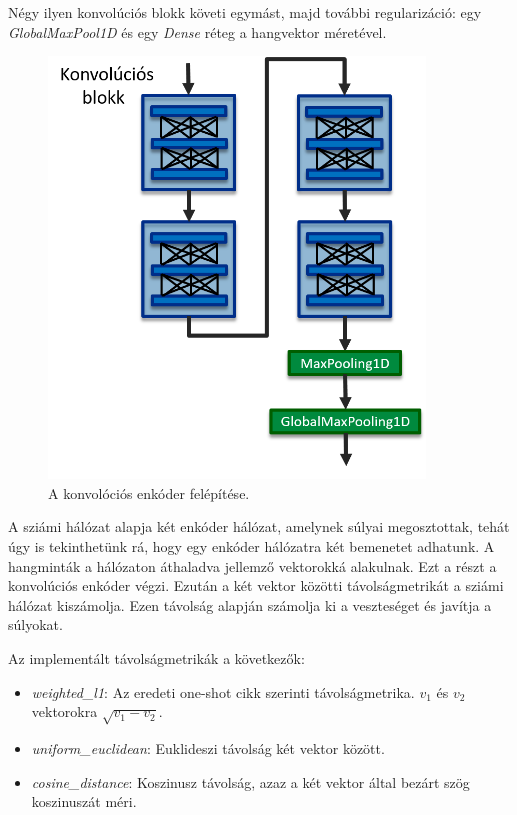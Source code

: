Négy ilyen konvolúciós blokk követi egymást, majd további regularizáció: egy \emph{GlobalMaxPool1D} és egy \emph{Dense} réteg a hangvektor méretével.

\begin{figure}[!ht]
	\centering
	\includegraphics[width=100mm, keepaspectratio]{figures/conv_encoder.png}
	\caption{A konvolóciós enkóder felépítése.}
	\label{fig:conv_encoder}
\end{figure}

A sziámi hálózat alapja két enkóder hálózat, amelynek súlyai megosztottak, tehát úgy is tekinthetünk rá, hogy egy enkóder hálózatra két bemenetet adhatunk. A hangminták a hálózaton áthaladva jellemző vektorokká alakulnak. Ezt a részt a konvolúciós enkóder végzi. Ezután a két vektor közötti távolságmetrikát a sziámi hálózat kiszámolja. Ezen távolság alapján számolja ki a veszteséget és javítja a súlyokat.

Az implementált távolságmetrikák a következők:

\begin{itemize}
	\item \emph{weighted\_l1}: Az eredeti one-shot cikk szerinti távolságmetrika. $v_1$ és $v_2$ vektorokra $\sqrt{v_1-v_2}$.
	\item \emph{uniform\_euclidean}: Euklideszi távolság két vektor között.
	\item \emph{cosine\_distance}: Koszinusz távolság, azaz a két vektor által bezárt szög koszinuszát méri.
\end{itemize}

